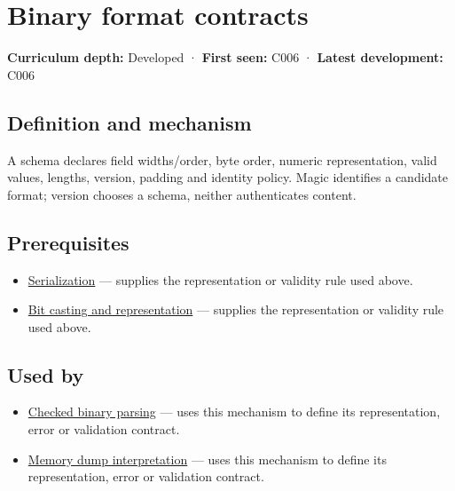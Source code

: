\hypertarget{appendix-590bbb2424c1}{}\label{referencestart:appendix-590bbb2424c1}
\section{Binary format contracts}\label{appendix-590bbb2424c1-binary-format-contracts}

\textbf{Curriculum depth:} Developed · \textbf{First seen:} C006 · \textbf{Latest development:} C006

\subsection{Definition and mechanism}\label{appendix-590bbb2424c1-definition-and-mechanism}

A schema declares field widths/order, byte order, numeric representation, valid values, lengths, version, padding and identity policy. Magic identifies a candidate format; version chooses a schema, neither authenticates content.

\subsection{Prerequisites}\label{appendix-590bbb2424c1-prerequisites}

\begin{itemize}
\tightlist
\item
  \hyperref[appendix-91d09ebed979]{Serialization} --- supplies the representation or validity rule used above.
\item
  \hyperref[appendix-34ee45f161c1]{Bit casting and representation} --- supplies the representation or validity rule used above.
\end{itemize}

\subsection{Used by}\label{appendix-590bbb2424c1-used-by}

\begin{itemize}
\tightlist
\item
  \hyperref[appendix-652d81568de9]{Checked binary parsing} --- uses this mechanism to define its representation, error or validation contract.
\item
  \hyperref[appendix-230b59c0676b]{Memory dump interpretation} --- uses this mechanism to define its representation, error or validation contract.
\end{itemize}

